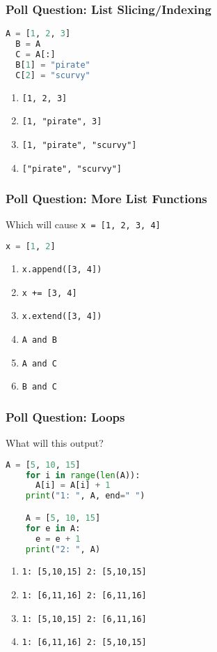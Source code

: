 \documentclass{beamer}
\begin{document}
%
%
\begin{frame}[fragile]
  \frametitle{Poll Question: List Slicing/Indexing}
  \begin{lstlisting}[language=Python, autogobble]
  A = [1, 2, 3]
  B = A
  C = A[:]
  B[1] = "pirate"
  C[2] = "scurvy"
  \end{lstlisting}
  \vfill
  \begin{enumerate}[A]
    \item \lstinline|[1, 2, 3]|
    \item \lstinline|[1, "pirate", 3]|
    \item \lstinline|[1, "pirate", "scurvy"]|
    \item \lstinline|["pirate", "scurvy"]|
  \end{enumerate}
\end{frame}

%
%
\begin{frame}[fragile]
  \frametitle{Poll Question: More List Functions}
  Which will cause \lstinline|x = [1, 2, 3, 4]|
  \begin{lstlisting}[language=Python, autogobble]
  x = [1, 2]
  \end{lstlisting}
  \vfill
  \begin{enumerate}[A]
    \item \lstinline|x.append([3, 4])|
    \item \lstinline|x += [3, 4]|
    \item \lstinline|x.extend([3, 4])|
    \item \lstinline|A and B|
    \item \lstinline|A and C|
    \item \lstinline|B and C|
  \end{enumerate}
\end{frame}

%
%
\begin{frame}[fragile]
  \frametitle{Poll Question: Loops}
  What will this output?\\
  \begin{minipage}{0.48\textwidth}
    \begin{lstlisting}[language=Python, autogobble]
    A = [5, 10, 15]
    for i in range(len(A)):
      A[i] = A[i] + 1
    print("1: ", A, end=" ")

    A = [5, 10, 15]
    for e in A:
      e = e + 1
    print("2: ", A)
    \end{lstlisting}
  \end{minipage}
  \hfill
  \begin{minipage}{0.48\textwidth}
    \begin{enumerate}[A]
      \item \lstinline|1: [5,10,15] 2: [5,10,15]|
      \item \lstinline|1: [6,11,16] 2: [6,11,16]|
      \item \lstinline|1: [5,10,15] 2: [6,11,16]|
      \item \lstinline|1: [6,11,16] 2: [5,10,15]|
    \end{enumerate}
  \end{minipage}
\end{frame}
\end{document}
